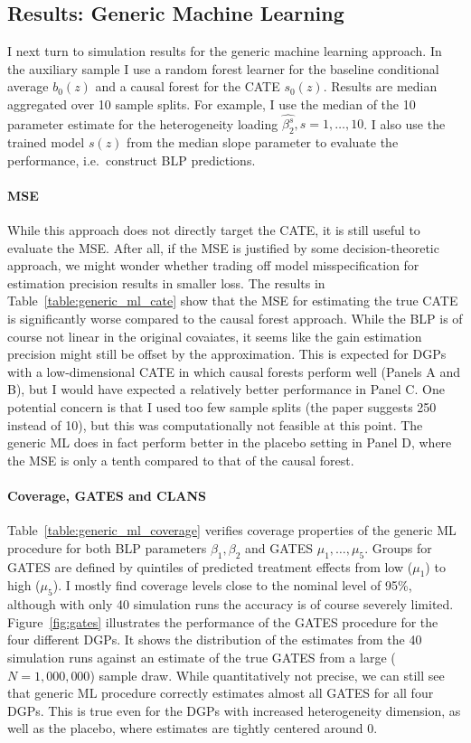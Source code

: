 \documentclass[11pt, a4paper, leqno]{article}
\begin{document}
\subsection{Results: Generic Machine Learning}
I next turn to simulation results for the generic machine learning approach.
In the auxiliary sample I use a random forest learner for the baseline conditional average $b_0(z)$ and a causal forest for the CATE $s_0(z)$.
Results are median aggregated over 10 sample splits. For example, I use the median of the 10 parameter estimate for the heterogeneity loading $\hat{\beta_2^s}, s=1,\ldots,10$.
I also use the trained model $s(z)$ from the median slope parameter to evaluate the performance, i.e.\ construct BLP predictions.

\paragraph*{MSE}
While this approach does not directly target the CATE, it is still useful to evaluate the MSE\@.
After all, if the MSE is justified by some decision-theoretic approach, we might wonder whether trading off model misspecification for estimation precision results in smaller loss.
The results in Table~\ref*{table:generic_ml_cate} show that the MSE for estimating the true CATE is significantly worse compared to the causal forest approach.
While the BLP is of course not linear in the original covaiates, it seems like the gain estimation precision might still be offset by the approximation.
This is expected for DGPs with a low-dimensional CATE in which causal forests perform well (Panels A and B), but I would have expected a relatively better performance in Panel C.
One potential concern is that I used too few sample splits (the paper suggests 250 instead of 10), but this was computationally not feasible at this point.
The generic ML does in fact perform better in the placebo setting in Panel D, where the MSE is only a tenth compared to that of the causal forest.

\paragraph*{Coverage, GATES and CLANS}
Table~\ref*{table:generic_ml_coverage} verifies coverage properties of the generic ML procedure for both BLP parameters $\beta_1, \beta_2$ and GATES $\mu_1, \ldots, \mu_5$.
Groups for GATES are defined by quintiles of predicted treatment effects from low ($\mu_1$) to high ($\mu_5$).
I mostly find coverage levels close to the nominal level of 95\%, although with only 40 simulation runs the accuracy is of course severely limited.
Figure~\ref*{fig:gates} illustrates the performance of the GATES procedure for the four different DGPs\@.
It shows the distribution of the estimates from the 40 simulation runs against an estimate of the true GATES from a large ($N=1,000,000$) sample draw.
While quantitatively not precise, we can still see that generic ML procedure correctly estimates almost all GATES for all four DGPs.
This is true even for the DGPs with increased heterogeneity dimension, as well as the placebo, where estimates are tightly centered around 0.
\end{document}

